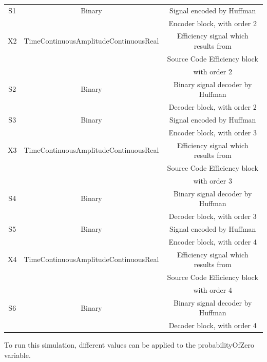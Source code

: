 \begin{refsection}
\begin{table}[h]
\begin{tabular}{|c|c|c|}
S1                                              &  Binary                          & Signal encoded by Huffman\\ 
 && Encoder block, with order 2\\ 
\hline
X2                                              &  TimeContinuousAmplitudeContinuousReal   &Efficiency signal which results from                 \\
 &&Source Code Efficiency block\\ 
 && with order 2\\ 
 \hline
S2                                              &  Binary                        & Binary signal decoder by Huffman\\ 
 &&  Decoder block, with order 2\\ 
\hline
S3                                              &  Binary    &Signal encoded by Huffman\\ 
 && Encoder block, with order 3\\ 
\hline
X3                                              &  TimeContinuousAmplitudeContinuousReal &   Efficiency signal which results from                 \\
 &&Source Code Efficiency block\\ 
 && with order 3\\ 
 \hline
S4                                              &  Binary                                   & Binary signal decoder by Huffman\\ 
 &&  Decoder block, with order 3\\ 
\hline
S5                                              &  Binary    &Signal encoded by Huffman\\ 
 && Encoder block, with order 4\\ 
\hline
X4                                              &  TimeContinuousAmplitudeContinuousReal &   Efficiency signal which results from                 \\
 &&Source Code Efficiency block\\ 
 && with order 4\\ 
 \hline
S6                                              &  Binary                                   & Binary signal decoder by Huffman\\ 
 &&  Decoder block, with order 4\\ 
\hline
\end{tabular}
\end{table}

To run this simulation, different values can be applied to the probabilityOfZero variable.


\clearpage
\end{refsection}
\cleardoublepage
